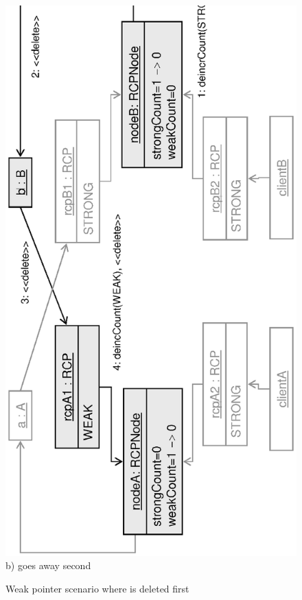 \documentclass[pdf,ps2pdf,11pt]{SANDreport}
\begin{document}
{\begin{figure}
\begin{center}
\includegraphics*[angle=270,scale=0.65]{CircularRCP_A_B_ClientA_2}
\\[2ex] b) {} goes away second \\[3ex]
\end{center}
\caption{
\label{fig:CircularRCP_A_B_ClientA}
Weak pointer scenario where {} is deleted first  }
\end{figure}
\esinglespace}
\end{document}
